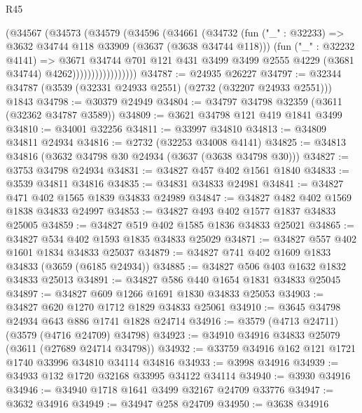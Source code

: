 \begin{lexlean}{R45}
\begin{coremodule}
                        (@34567
                          (@34573
                            (@34579
                              (@34596
                                (@34661
                                  (@34732
                                    (fun ("_" : @32233) =>
                                    @3632 @34744 @118 @33909 (@3637 (@3638 @34744 @118)))
                                    (fun ("_" : @32232 @4141) =>
                                    @3671
                                      @34744
                                      @701
                                      @121
                                      @431
                                      @3499
                                      @3499
                                      @2555
                                      @4229
                                      (@3681 @34744)
                                      @4262)))))))))))))))))
@34787 := @24935 @26227
@34797 := @32344 @34787 (@3539 (@32331 @24933 @2551) (@2732 (@32207 @24933 @2551))) @1843
@34798 := @30379 @24949
@34804 := @34797 @34798 @32359 (@3611 (@32362 @34787 @3589))
@34809 := @3621 @34798 @121 @419 @1841 @3499
@34810 := @34001 @32256
@34811 := @33997 @34810
@34813 := @34809 @34811 @24934
@34816 := @2732 (@32253 @34008 @4141)
@34825 := @34813 @34816 (@3632 @34798 @30 @24934 (@3637 (@3638 @34798 @30)))
@34827 := @3753 @34798 @24934
@34831 := @34827 @457 @402 @1561 @1840
@34833 := @3539 @34811 @34816
@34835 := @34831 @34833 @24981
@34841 := @34827 @471 @402 @1565 @1839 @34833 @24989
@34847 := @34827 @482 @402 @1569 @1838 @34833 @24997
@34853 := @34827 @493 @402 @1577 @1837 @34833 @25005
@34859 := @34827 @519 @402 @1585 @1836 @34833 @25021
@34865 := @34827 @534 @402 @1593 @1835 @34833 @25029
@34871 := @34827 @557 @402 @1601 @1834 @34833 @25037
@34879 := @34827 @741 @402 @1609 @1833 @34833 (@3659 (@6185 @24934))
@34885 := @34827 @506 @403 @1632 @1832 @34833 @25013
@34891 := @34827 @586 @440 @1654 @1831 @34833 @25045
@34897 := @34827 @609 @1266 @1691 @1830 @34833 @25053
@34903 := @34827 @620 @1270 @1712 @1829 @34833 @25061
@34910 := @3645 @34798 @24934 @643 @886 @1741 @1828 @24714
@34916 := @3579 (@4713 @24711) (@3579 (@4716 @24709) @34798)
@34923 := @34910 @34916 @34833 @25079 (@3611 (@27689 @24714 @34798))
@34932 := @33759 @34916 @162 @121 @1721 @1740 @33996 @34810 @34114 @34816
@34933 := @3998 @34916
@34939 := @34933 @132 @1720 @32168 @33995 @34122 @34114
@34940 := @3930 @34916
@34946 := @34940 @1718 @1641 @3499 @32167 @24709 @33776
@34947 := @3632 @34916
@34949 := @34947 @258 @24709
@34950 := @3638 @34916

\end{coremodule}
\end{lexlean}
